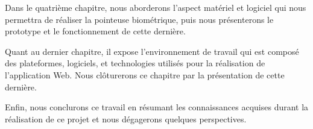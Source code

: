 Dans le quatrième chapitre, nous aborderons l’aspect matériel et logiciel qui
nous permettra de réaliser la pointeuse biométrique, puis nous présenterons le
prototype et le fonctionnement de cette dernière.
\clearpage

Quant au dernier chapitre, il expose l’environnement de travail qui est composé
des plateformes, logiciels, et technologies utilisés pour la réalisation de
l’application Web. Nous clôturerons ce chapitre par la présentation de
cette dernière.

Enfin, nous conclurons ce travail en résumant les connaissances acquises durant la réalisation de
ce projet et nous dégagerons quelques perspectives.
